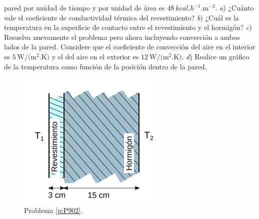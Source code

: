 \begin{Exercise}
{pared por unidad de tiempo y por unidad de área es $\SI{48}{kcal.h^{-1}.\metre^{-2}}$. \textit{a}) ¿Cuánto vale el coeficiente de conductividad térmica del revestimiento? \textit{b}) ¿Cuál es la temperatura en la superficie de contacto entre el revestimiento y el hormigón? \textit{c}) Resuelva nuevamente el problema pero ahora incluyendo convección a ambos lados de la pared. Considere que el coeficiente de convección del aire en el interior es $\SI{5}{\watt/(\square\metre.\kelvin)}$ y el del aire en el exterior es $\SI{12}{\watt/(\square\metre.\kelvin)}$.
\textit{d}) Realice un gráfico de la temperatura como función de la posición dentro de la pared.
\\ 
}
%
\begin{figure}[h!]
  \begin{center}
    \includegraphics[scale=1]{termodinamica/img/termo_transmision_hormigon.png}
    \caption{Problema \ref{p:P902}.}\label{f:P902}
  \end{center}
\end{figure}
%
\end{Exercise}
